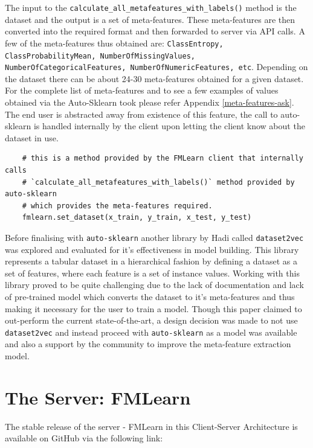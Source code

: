 The input to the \texttt{calculate\_all\_metafeatures\_with\_labels()} method is the dataset and the output is a set of meta-features. These meta-features are then converted into the required format and then forwarded to server via API calls. A few of the meta-features thus obtained are: \texttt{ClassEntropy, ClassProbabilityMean, NumberOfMissingValues, NumberOfCategoricalFeatures, NumberOfNumericFeatures, etc}. Depending on the dataset there can be about 24-30 meta-features obtained for a given dataset. For the complete list of meta-features and to see a few examples of values obtained via the Auto-Sklearn took please refer Appendix \ref{meta-features-ask}. The end user is abstracted away from existence of this feature, the call to auto-sklearn is handled internally by the client upon letting the client know about the dataset in use.

\begin{lstlisting}
    # this is a method provided by the FMLearn client that internally calls
    # `calculate_all_metafeatures_with_labels()` method provided by auto-sklearn
    # which provides the meta-features required.
    fmlearn.set_dataset(x_train, y_train, x_test, y_test)
\end{lstlisting}

Before finalising with \texttt{auto-sklearn} another library by Hadi called \texttt{dataset2vec} \citep{dataset2vec} was explored and evaluated for it's effectiveness in model building. This library represents a tabular dataset in a hierarchical fashion by defining a dataset as a set of features, where each feature is a set of instance values. Working with this library proved to be quite challenging due to the lack of documentation and lack of pre-trained model which converts the dataset to it's meta-features and thus making it necessary for the user to train a model. Though this paper claimed to out-perform the current state-of-the-art, a design decision was made to not use \texttt{dataset2vec} and instead proceed with \texttt{auto-sklearn} as a model was available and also a support by the community to improve the meta-feature extraction model.

\section{The Server: FMLearn}
\label{fmlearn-server}

The stable release of the server - FMLearn in this Client-Server Architecture is available on GitHub via the following link:

